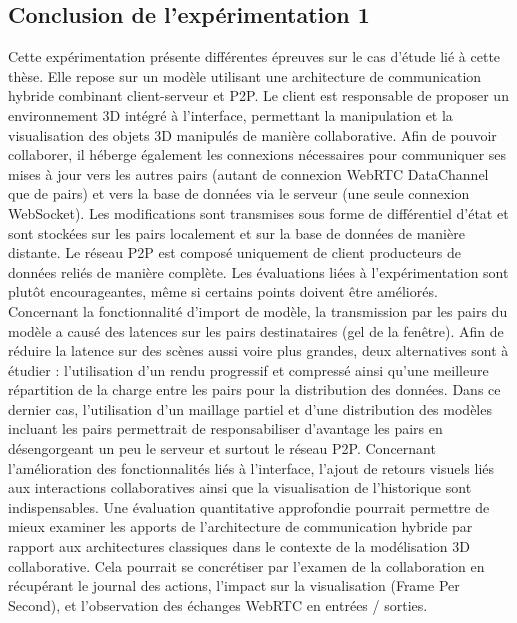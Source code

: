\subsection{Conclusion de l'expérimentation 1}


Cette expérimentation présente différentes épreuves sur le cas d'étude lié à cette 
thèse. Elle repose sur un modèle utilisant une architecture de communication 
hybride combinant client-serveur et \gls{P2P}. Le client est responsable de 
proposer un environnement \gls{3D} intégré à l'interface, permettant la 
manipulation et 
la visualisation des objets \gls{3D} manipulés de manière collaborative. Afin de 
pouvoir 
collaborer, il héberge également les connexions nécessaires pour communiquer ses 
mises à jour vers les autres pairs (autant de connexion WebRTC DataChannel que 
de pairs) et vers la base de données via le serveur (une seule connexion 
WebSocket). Les modifications sont transmises sous forme de différentiel d'état et 
sont stockées sur les pairs localement et sur la base de données de manière 
distante. Le réseau \gls{P2P} est composé uniquement de client producteurs de 
données reliés de manière complète. 
Les évaluations liées à l'expérimentation sont plutôt encourageantes, même si 
certains points doivent être améliorés. Concernant la fonctionnalité d'import de 
modèle, la transmission par les pairs du modèle a causé des latences sur les 
pairs destinataires (gel de la fenêtre). Afin de réduire la latence sur des scènes 
aussi voire plus grandes, deux alternatives sont à étudier : l'utilisation d'un 
rendu progressif et compressé ainsi qu'une meilleure répartition de la charge entre 
les pairs pour la distribution des données. Dans ce dernier cas, l'utilisation d'un 
maillage partiel et d'une distribution des modèles incluant les pairs permettrait de 
responsabiliser d'avantage les pairs en désengorgeant un peu le serveur et surtout 
le réseau \gls{P2P}.
Concernant l'amélioration des fonctionnalités liés à l'interface, l'ajout de retours 
visuels liés aux interactions collaboratives ainsi que la visualisation de l'historique sont 
indispensables. Une évaluation quantitative approfondie pourrait permettre de 
mieux examiner les apports de l'architecture de communication hybride par rapport 
aux architectures classiques dans le contexte de la modélisation \gls{3D} 
collaborative. 
Cela pourrait se concrétiser par l'examen de la collaboration en récupérant le 
journal des actions, l'impact sur la visualisation (Frame Per Second), et 
l'observation des échanges WebRTC en entrées / sorties.

